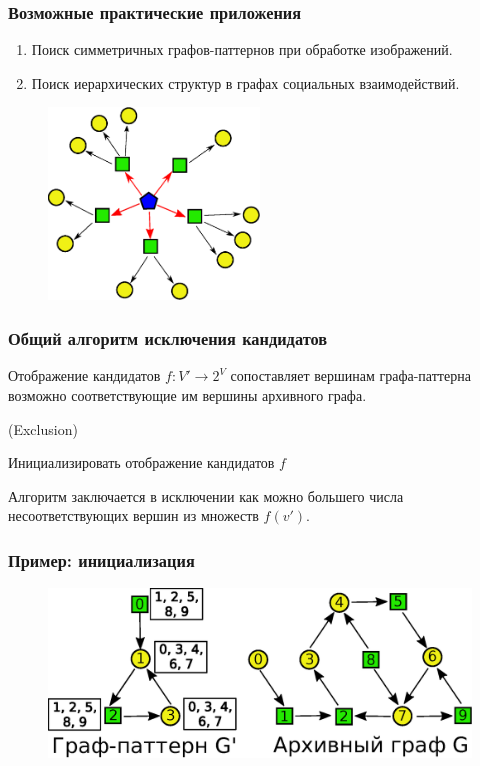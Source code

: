 \documentclass{beamer}
\begin{document}
\begin{frame}
\frametitle{Возможные практические приложения}
\begin{enumerate}
	\item Поиск симметричных графов-паттернов при обработке изображений.
	\item Поиск иерархических структур в графах социальных взаимодействий.
\end{enumerate}
\begin{figure}[H]
	\centering
	\includegraphics[width=0.5\textwidth]{ierar}
	\label{fig:ierar}
\end{figure}
\end{frame}

\begin{frame}
\frametitle{Общий алгоритм исключения кандидатов}

Отображение кандидатов $f : V' \to 2^V$ сопоставляет вершинам графа-паттерна возможно соответствующие им вершины архивного графа.

\begin{algorithm}[H]
	\Begin(Exclusion){		
		Инициализировать отображение кандидатов $f$
		
	}
\end{algorithm}

Алгоритм заключается в исключении как можно большего числа несоответствующих вершин из множеств $f(v')$.

\end{frame}

\begin{frame}
\frametitle{Пример: инициализация}
\begin{figure}[H]
	\centering
	\includegraphics[width=1\textwidth]{ee9}
	\label{fig:ee9}
\end{figure}
\end{frame}
\end{document}
